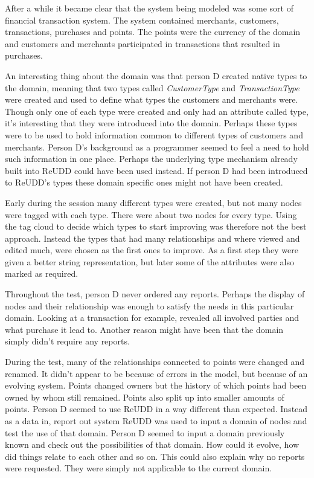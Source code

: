 \documentclass[a4paper]{report}
\begin{document}
After a while it became clear that the system being modeled was some sort of financial transaction system. The system contained merchants, customers, transactions, purchases and points. The points were the currency of the domain and customers and merchants participated in transactions that resulted in purchases.

An interesting thing about the domain was that person D created native types to the domain, meaning that two types called \emph{CustomerType} and \emph{TransactionType} were created and used to define what types the customers and merchants were. Though only one of each type were created and only had an attribute called type, it's interesting that they were introduced into the domain. Perhaps these types were to be used to hold information common to different types of customers and merchants. Person D's background as a programmer seemed to feel a need to hold such information in one place. Perhaps the underlying type mechanism already built into ReUDD could have been used instead. If person D had been introduced to ReUDD's types these domain specific ones might not have been created.

Early during the session many different types were created, but not many nodes were tagged with each type. There were about two nodes for every type. Using the tag cloud to decide which types to start improving was therefore not the best approach. Instead the types that had many relationships and where viewed and edited much, were chosen as the first ones to improve. As a first step they were given a better string representation, but later some of the attributes were also marked as required.

Throughout the test, person D never ordered any reports. Perhaps the display of nodes and their relationship was enough to satisfy the needs in this particular domain. Looking at a transaction for example, revealed all involved parties and what purchase it lead to. Another reason might have been that the domain simply didn't require any reports.

During the test, many of the relationships connected to points were changed and renamed. It didn't appear to be because of errors in the model, but because of an evolving system. Points changed owners but the history of which points had been owned by whom still remained. Points also split up into smaller amounts of points. Person D seemed to use ReUDD in a way different than expected. Instead as a data in, report out system ReUDD was used to input a domain of nodes and test the use of that domain. Person D seemed to input a domain previously known and check out the possibilities of that domain. How could it evolve, how did things relate to each other and so on. This could also explain why no reports were requested. They were simply not applicable to the current domain.
\end{document}
